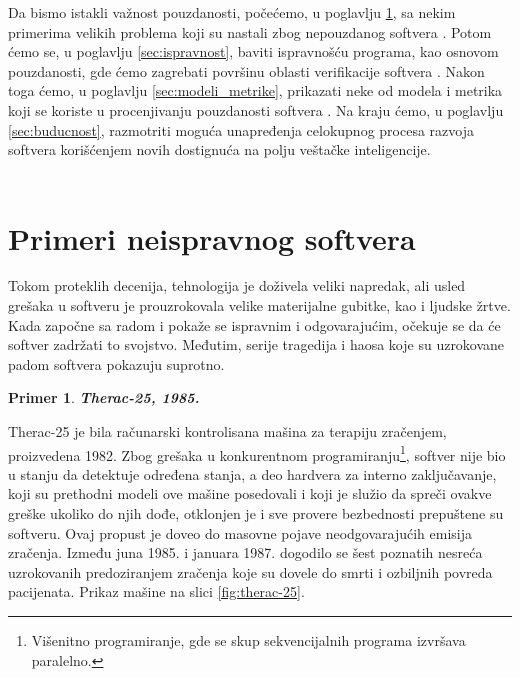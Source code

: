 \documentclass[a4paper]{article}
\newtheorem{primer}{Primer}[section]
\begin{document}
Da bismo istakli važnost pouzdanosti, počećemo, u poglavlju \ref{sec:primeri}, sa nekim primerima velikih problema koji su nastali zbog nepouzdanog softvera \cite{quinn_ethics}.
Potom ćemo se, u poglavlju \ref{sec:ispravnost}, baviti ispravnošću programa, kao osnovom pouzdanosti, gde ćemo zagrebati površinu oblasti verifikacije softvera \cite{laski2009software}.
Nakon toga ćemo, u poglavlju \ref{sec:modeli_metrike}, prikazati neke od modela i metrika koji se koriste u procenjivanju pouzdanosti softvera \cite{pham_reliability}.
Na kraju ćemo, u poglavlju \ref{sec:buducnost}, razmotriti moguća unapređenja celokupnog procesa razvoja softvera korišćenjem novih dostignuća na polju veštačke inteligencije.\\\\


\section{Primeri neispravnog softvera}
\label{sec:primeri}

Tokom proteklih decenija, tehnologija je doživela veliki napredak, ali usled grešaka u softveru je prouzrokovala velike materijalne gubitke, kao i ljudske žrtve. Kada započne sa radom i pokaže se ispravnim i odgovarajućim, očekuje se da će softver zadržati to svojstvo. Međutim, serije tragedija i haosa koje su uzrokovane padom softvera pokazuju suprotno.\\

\begin{primer}
\textbf{Therac-25, 1985.}
\end{primer}
Therac-25 je bila računarski kontrolisana mašina za terapiju zračenjem, proizvedena 1982.
Zbog grešaka u konkurentnom programiranju\footnote{ Višenitno programiranje, gde se skup sekvencijalnih programa izvršava paralelno.}, softver nije bio u stanju da detektuje određena stanja, a deo hardvera za interno zaključavanje, koji su prethodni modeli ove mašine posedovali i koji je služio da spreči ovakve greške ukoliko do njih dođe, otklonjen je i sve provere bezbednosti prepuštene su softveru. Ovaj propust je doveo do masovne pojave neodgovarajućih emisija zračenja.
Između juna 1985. i januara 1987. dogodilo se šest poznatih nesreća uzrokovanih predoziranjem zračenja koje su dovele do smrti i ozbiljnih povreda pacijenata. Prikaz mašine na slici \ref{fig:therac-25}.
\end{document}
